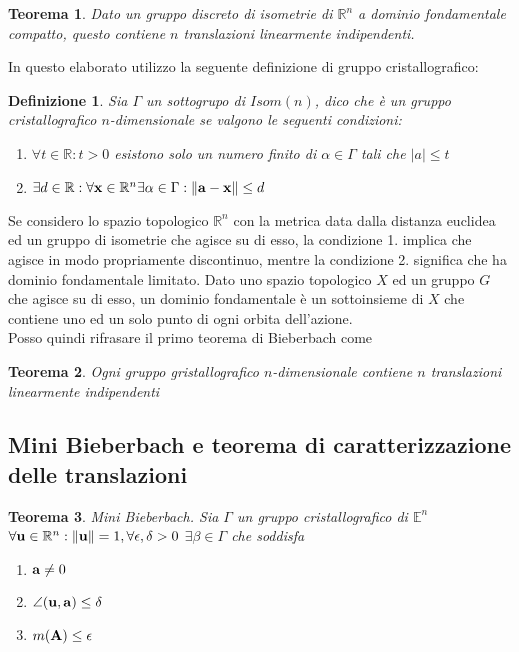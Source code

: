 \documentclass[10pt,a4paper]{book}
\newtheorem{definition}{Definizione}[section]
\newtheorem{theorem}{Teorema}[section]
\begin{document}
\begin{theorem}
Dato un gruppo discreto di isometrie di $\mathbb{R}^n$ a dominio fondamentale compatto, questo contiene $n$ translazioni linearmente indipendenti. 
\end{theorem}
In questo elaborato utilizzo la seguente definizione di gruppo cristallografico:
\begin{definition}
Sia $\Gamma$ un sottogrupo di $Isom(n)$, dico che è un gruppo cristallografico $n$-dimensionale se valgono le seguenti condizioni:
\begin{enumerate}
	\item $ \forall t \in \mathbb{R} : t > 0 $  esistono solo un numero finito di $\alpha \in \Gamma $  tali che  $|a| \leq t$

	\item $ \exists d \in \mathbb{R}: \forall \vb{x} \in \mathbb{R}^n   \exists \alpha \in \Gamma : \norm{\vb{a-x}}\leq d $
\end{enumerate}
\end{definition}
Se considero lo spazio topologico $\mathbb{R}^n$ con la metrica data dalla distanza euclidea ed un gruppo di isometrie che agisce su di esso, la condizione 1. implica che agisce in modo propriamente discontinuo, mentre la condizione 2. significa che ha dominio fondamentale limitato. Dato uno spazio topologico $X$ ed un gruppo $G$ che agisce su di esso, un dominio fondamentale è un sottoinsieme di $X$ che contiene uno ed un solo punto di ogni orbita dell'azione.\\

Posso quindi rifrasare il primo teorema di Bieberbach come 

\begin{theorem}
Ogni gruppo gristallografico $n$-dimensionale contiene $n$ translazioni linearmente indipendenti
\end{theorem}

\subsection{Mini Bieberbach e teorema di caratterizzazione delle translazioni} 
\begin{theorem}{Mini Bieberbach.}
Sia $\Gamma$ un gruppo cristallografico di $\mathbb{E}^n$ \\
$ \forall \vb{u} \in \mathbb{R}^n : \norm{\vb{u}} = 1,   \forall \epsilon , \delta >0 $ \hfill  $   \exists \beta \in \Gamma $ che soddisfa \hfill
\begin{minipage}{0.3\textwidth} 
\begin{enumerate}
\item $\vb{a} \neq 0$ 
\item $ \angle (\vb{u, a}) \leq \delta $
\item $ m(\vb{A}) \leq \epsilon$ 
\end{enumerate}
\end{minipage}
\end{theorem}
\end{document}
